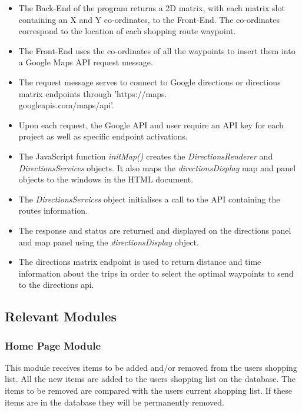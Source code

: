 \documentclass[10pt,twocolumn]{witseiepaper}
\begin{document}
		\begin{itemize}
			\item The Back-End of the program returns a 2D matrix, with each matrix slot containing an X and Y co-ordinates, to the Front-End. The co-ordinates correspond to the location of each shopping route waypoint. 
			\item The Front-End uses the co-ordinates of all the waypoints to insert them into a Google Maps API request message.
			\item The request message serves to connect to Google directions or directions matrix endpoints through 'https://maps.\\googleapis.com/maps/api'.
			\item Upon each request, the Google API and user require an API key for each project as well as specific endpoint activations.
			\item The JavaScript function \textit{initMap()} creates the \textit{DirectionsRenderer} and \textit{DirectionsServices} objects. It also maps the \textit{directionsDisplay} map and panel objects to the windows in the HTML document.
			\item The \textit{DirectionsServices} object initialises a call to the API containing the routes information.
			\item The response and status are returned and displayed on the directions panel and map panel using the \textit{directionsDisplay} object.
			\item The directions matrix endpoint is used to return distance and time information about the trips in order to select the optimal waypoints to send to the directions api.
		\end{itemize}
		
\begin{center}
\end{center}

	
	\subsection{Relevant Modules}
	
		\subsubsection{Home Page Module}
		
		This module receives items to be added and/or removed from the users shopping list. All the new items are added to the users shopping list on the database. The items to be removed are compared with the users current shopping list. If these items are in the database they will be permanently removed.\\
		
\end{document}
